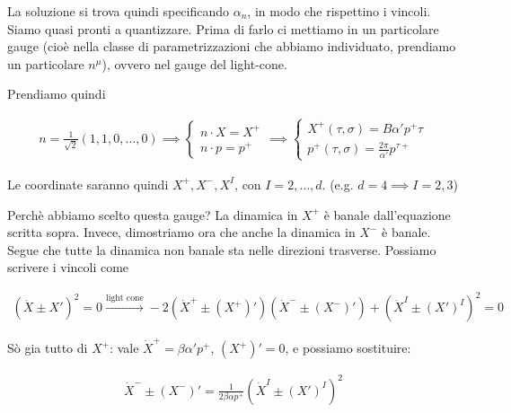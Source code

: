 \documentclass{report}
\begin{document}
La soluzione si trova quindi specificando \(\alpha_n\), in modo che rispettino i vincoli. Siamo quasi pronti a quantizzare. Prima di farlo ci mettiamo in un particolare gauge (cioè nella classe di parametrizzazioni che abbiamo individuato, prendiamo un particolare \(n^\mu\)), ovvero nel gauge del light-cone. 

Prendiamo quindi 

\begin{align}
    n = \frac{1}{\sqrt{2}}(1, 1, 0 , \ldots, 0) \implies \begin{cases}
        n\cdot X = X^+ \\ n\cdot p = p^+
    \end{cases} \implies \begin{cases}
        X^+(\tau, \sigma) = B\alpha'p^+ \tau \\ p^+ (\tau, \sigma) = \frac{2\pi}{\alpha'}p^{\tau +}
    \end{cases}
\end{align}

Le coordinate saranno quindi \(X^+, X^-, X^I\), con \(I = 2, \ldots, d\). (e.g. \(d=4 \implies I= 2, 3\))

Perchè abbiamo scelto questa gauge? La dinamica in \(X^+\) è banale dall'equazione scritta sopra. Invece, dimostriamo ora che anche la dinamica in \(X^-\) è banale. Segue che tutte la dinamica non banale sta nelle direzioni trasverse. Possiamo scrivere i vincoli come 

\begin{align}
    (\dot{X} \pm X')^2 = 0 \xrightarrow{\text{light cone}} -2(\dot{X}^+ \pm (X^+)')(\dot{X}^- \pm (X^-)') + (\dot{X}^I \pm (X')^I)^2 = 0 
\end{align}

Sò gia tutto di \(X^+\): vale \(\dot{X}^+ = \beta \alpha' p^+\), \((X^+)' = 0\), e possiamo sostituire: 

\begin{align}
    \dot{X}^- \pm (X^-)' = \frac{1}{2\beta\alpha p^+}(\dot{X}^I \pm (X')^I)^2 
\end{align}

\end{document}
